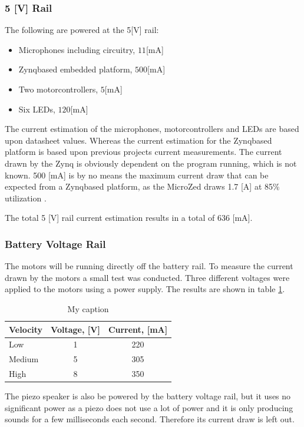 \subsubsection*{5 [V] Rail} %

The following are powered at the 5[V] rail:
\begin{itemize}
	\item Microphones including circuitry, $11$[mA]
	\item Zynqbased embedded platform, $500$[mA]
	\item Two motorcontrollers, $5$[mA]
	\item Six LEDs, $120$[mA]
\end{itemize}
The current estimation of the microphones, motorcontrollers and LEDs are based upon datasheet values. 
Whereas the current estimation for the Zynqbased platform is based upon previous projects current measurements. 
The current drawn by the Zynq is obviously dependent on the program running, which is not known.
500 [mA] is by no means the maximum current draw that can be expected from a Zynqbased platform, as the MicroZed draws 1.7 [A] at 85\% utilization \cite{microzed_hardware_guide}.

The total 5 [V] rail current estimation results in a total of $636$ [mA].

\subsubsection*{Battery Voltage Rail} %

The motors will be running directly off the battery rail.
To measure the current drawn by the motors a small test was conducted.
Three different voltages were applied to the motors using a power supply. 
The results are shown in table \ref{tab:motor_power}.

\begin{table}[h]
\centering
\caption{My caption}
\label{tab:motor_power}
\begin{tabular}{|l|c|c|}
\hline
\textbf{Velocity} & Voltage, [V]   & Current, [mA]      \\ \hline
Low     & 1  & 220  \\ \hline
Medium & 5  & 305  \\ \hline
High         & 8  & 350  \\ \hline
\end{tabular}
\end{table}

The piezo speaker is also be powered by the battery voltage rail, but it uses no significant power as a piezo does not use a lot of power and it is only producing sounds for a few milliseconds each second. 
Therefore its current draw is left out.

